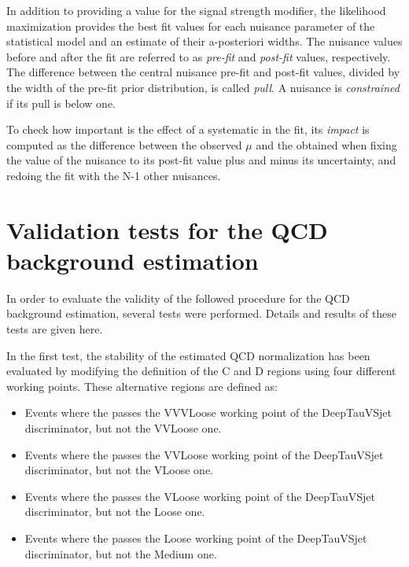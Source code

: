 \documentclass[../main.tex]{subfiles}
\begin{document}
In addition to providing a value for the signal strength modifier, the likelihood maximization provides the best fit values for each nuisance parameter of the statistical model and an estimate of their a-posteriori widths. The nuisance values before and after the fit are referred to as \textit{pre-fit} and \textit{post-fit} values, respectively. The difference between the central nuisance pre-fit and post-fit values, divided by the width of the pre-fit prior distribution, is called \textit{pull}. A nuisance is \textit{constrained} if its pull is below one.

To check how important is the effect of a systematic in the fit, its \textit{impact} is computed as the difference between the observed $\mu$ and the obtained when fixing the value of the nuisance to its post-fit value plus and minus its uncertainty, and redoing the fit with the N-1 other nuisances.



\section{Validation tests for the QCD background estimation}
\label{hh:sec:validation_qcd}


In order to evaluate the validity of the followed procedure for the QCD background estimation, several tests were performed. Details and results of these tests are given here.

In the first test, the stability of the estimated QCD normalization has been evaluated by modifying the definition of the C and D regions using four different \deeptau{} working points. These alternative regions are defined as:
\begin{itemize}
\item Events where the \tauh{} passes the VVVLoose working point of the DeepTauVSjet discriminator, but not the VVLoose one.
\item Events where the \tauh{} passes the VVLoose working point of the DeepTauVSjet discriminator, but not the VLoose one.
\item Events where the \tauh{} passes the VLoose working point of the DeepTauVSjet discriminator, but not the Loose one.
\item Events where the \tauh{} passes the Loose working point of the DeepTauVSjet discriminator, but not the Medium one.
\end{itemize}
\end{document}
